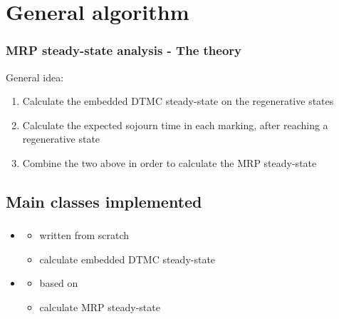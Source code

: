 \section{General algorithm}
\begin{frame}
  \frametitle{\acs{MRP} steady-state analysis - The theory}
  General idea:
  \begin{enumerate}
  \item<2-> Calculate the embedded \acs{DTMC} \alert{steady-state} on the
    regenerative states
  \item<3-> Calculate the expected \alert{sojourn time} in each marking, after
    reaching a regenerative state
  \item<4-> \alert{Combine} the two above in order to calculate the \acs{MRP} steady-state
  \end{enumerate}
  \begin{center}
  \end{center}
\end{frame}

\subsection{Main classes implemented}
\begin{frame}
  \frametitle{\insertsubsection}
  \begin{itemize}
	  \item {}
	  \begin{itemize}
	  	\item written from scratch
	  	\item calculate \alert{embedded \acs{DTMC}} steady-state
	  \end{itemize}
	  \item {}
	  \begin{itemize}
	  	\item based on 
	  	\item calculate \alert{\acs{MRP}} steady-state
	  \end{itemize}
  \end{itemize}
\end{frame}

